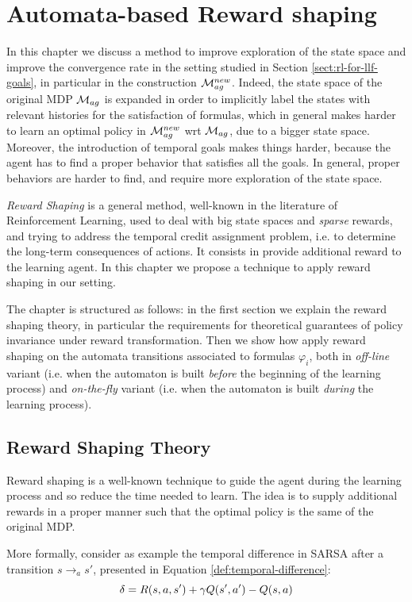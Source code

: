 \chapter{Automata-based Reward shaping}\label{ch:reward-shaping}
In this chapter we discuss a method to improve exploration of the state space and improve the convergence rate in the setting studied in Section \ref{sect:rl-for-llf-goals}, in particular in the construction $\mathcal{M}_{ag}^{new}$. 
Indeed, the state space of the original MDP $\mathcal{M}_{ag}$ is expanded in order to implicitly label the states with relevant histories for the satisfaction of \LLf formulas, which in general makes harder to learn an optimal policy in $\mathcal{M}_{ag}^{new}$ wrt $\mathcal{M}_{ag}$, due to a bigger state space. 
Moreover, the introduction of temporal goals makes things harder, because the agent has to find a proper behavior that satisfies all the goals. In general, proper behaviors are harder to find, and require more exploration of the state space.

\emph{Reward Shaping} is a general method, well-known in the literature of Reinforcement Learning, used to deal with big state spaces and \emph{sparse} rewards, and trying to address the temporal
credit assignment problem, i.e. to determine
the long-term consequences of actions. It consists in provide additional reward to the learning agent. In this chapter we propose a technique to apply reward shaping in our setting.

The chapter is structured as follows: in the first section we explain the reward shaping theory, in particular the requirements for theoretical guarantees of policy invariance under reward transformation. Then we show how apply reward shaping on the automata transitions associated to \LLf formulas $\varphi_i$, both in \emph{off-line} variant (i.e. when the automaton is built \emph{before} the beginning of the learning process)  and \emph{on-the-fly} variant (i.e. when the automaton is built \emph{during} the learning process).
 
\section{Reward Shaping Theory}
Reward shaping is a well-known technique to guide the agent during the learning process and so reduce the time needed to learn. The idea is to supply additional rewards in a proper manner such that the optimal policy is the same of the original MDP.

More formally, consider as example the temporal difference in SARSA after a transition $s \to_a s'$, presented in Equation \ref{def:temporal-difference}:
\begin{equation}
\delta = R(s,a,s') + \gamma Q(s', a') - Q(s, a)
\end{equation}

